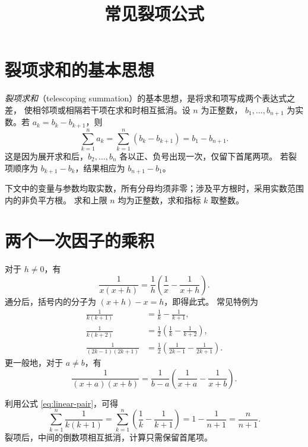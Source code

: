 \documentclass[UTF8,12pt,a4paper,fontset=fandol]{ctexart}
\title{常见裂项公式}
\author{}
\date{}
\begin{document}
\maketitle

\section{裂项求和的基本思想}

\emph{裂项求和}（telescoping summation）的基本思想，是将求和项写成两个表达式之差，
使相邻项或相隔若干项在求和时相互抵消。设 $n$ 为正整数，
$b_1,\ldots,b_{n+1}$ 为实数。若 $a_k=b_k-b_{k+1}$，则
\begin{equation}\label{eq:telescoping-basic}
  \sum_{k=1}^{n}a_k
  =\sum_{k=1}^{n}(b_k-b_{k+1})
  =b_1-b_{n+1}.
\end{equation}
这是因为展开求和后，$b_2,\ldots,b_n$ 各以正、负号出现一次，仅留下首尾两项。
若裂项顺序为 $b_{k+1}-b_k$，结果相应为 $b_{n+1}-b_1$。

下文中的变量与参数均取实数，所有分母均须非零；涉及平方根时，采用实数范围内的非负平方根。
求和上限 $n$ 均为正整数，求和指标 $k$ 取整数。

\section{两个一次因子的乘积}

对于 $h\ne0$，有
\begin{equation}\label{eq:linear-pair}
  \boxed{\frac1{x(x+h)}
  =\frac1h\left(\frac1x-\frac1{x+h}\right)}.
\end{equation}
通分后，括号内的分子为 $(x+h)-x=h$，即得此式。
常见特例为
\begin{align*}
  \frac1{k(k+1)}&=\frac1k-\frac1{k+1},\\
  \frac1{k(k+2)}&=\frac12\left(\frac1k-\frac1{k+2}\right),\\
  \frac1{(2k-1)(2k+1)}
  &=\frac12\left(\frac1{2k-1}-\frac1{2k+1}\right).
\end{align*}
更一般地，对于 $a\ne b$，有
\begin{equation}\label{eq:shifted-linear-pair}
  \boxed{\frac1{(x+a)(x+b)}
  =\frac1{b-a}\left(\frac1{x+a}-\frac1{x+b}\right)}.
\end{equation}

\begin{example}[相邻项抵消]
利用公式 \eqref{eq:linear-pair}，可得
\[
  \sum_{k=1}^{n}\frac1{k(k+1)}
  =\sum_{k=1}^{n}\left(\frac1k-\frac1{k+1}\right)
  =1-\frac1{n+1}=\frac{n}{n+1}.
\]
裂项后，中间的倒数项相互抵消，计算只需保留首尾项。
\end{example}
\end{document}
